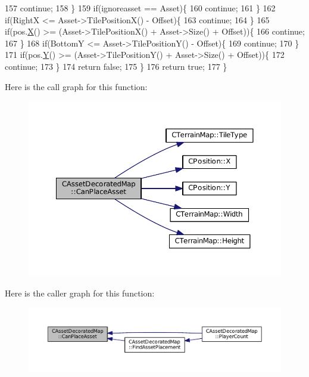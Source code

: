 \begin{DoxyCode}
157             \textcolor{keywordflow}{continue};    
158         \}
159         \textcolor{keywordflow}{if}(ignoreasset == Asset)\{
160             \textcolor{keywordflow}{continue};   
161         \}
162         \textcolor{keywordflow}{if}(RightX <= Asset->TilePositionX() - Offset)\{
163             \textcolor{keywordflow}{continue};   
164         \}
165         \textcolor{keywordflow}{if}(pos.\hyperlink{classCPosition_a9a6b94d3b91df1492d166d9964c865fc}{X}() >= (Asset->TilePositionX() + Asset->Size() + Offset))\{
166             \textcolor{keywordflow}{continue};   
167         \}
168         \textcolor{keywordflow}{if}(BottomY <= Asset->TilePositionY() - Offset)\{
169             \textcolor{keywordflow}{continue};   
170         \}
171         \textcolor{keywordflow}{if}(pos.\hyperlink{classCPosition_a1aa8a30e2f08dda1f797736ba8c13a87}{Y}() >= (Asset->TilePositionY() + Asset->Size() + Offset))\{
172             \textcolor{keywordflow}{continue};   
173         \}
174         \textcolor{keywordflow}{return} \textcolor{keyword}{false};
175     \}
176     \textcolor{keywordflow}{return} \textcolor{keyword}{true};
177 \}
\end{DoxyCode}
Here is the call graph for this function\+:\nopagebreak
\begin{figure}[H]
\begin{center}
\leavevmode
\includegraphics[width=350pt]{classCAssetDecoratedMap_ad4baef4b84b066847459e45205c8575c_cgraph}
\end{center}
\end{figure}
Here is the caller graph for this function\+:\nopagebreak
\begin{figure}[H]
\begin{center}
\leavevmode
\includegraphics[width=350pt]{classCAssetDecoratedMap_ad4baef4b84b066847459e45205c8575c_icgraph}
\end{center}
\end{figure}
